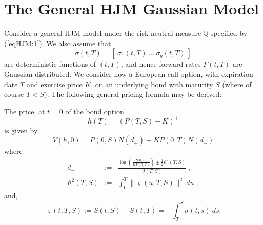 \section{The General HJM Gaussian Model}
Consider a general HJM model under the risk-neutral measure
$\mathbb{Q}$ specified by (\ref{eqHJM:1}). We also assume that 
$$
\sigma(t,T)= \left[\:\sigma_1(t,T)\:\dots\:\sigma_q(t,T)\:\right]
$$
are deterministic functions of $(t,T)$, and hence forward rates
$F(t,T)$ are Gaussian distributed. We consider now a European call
option, with expiration date $T$ and exercise price $K$, on an
underlying bond with maturity $S$ (where of course $T<S$). The
following general pricing formula may be derived:
\begin{propos} The
  price, at $t=0$ of the bond option
$$
h(T)=(P(T,S)-K)^+
$$
is given by
\begin{equation} 
\label{eqGaussianFROptionsFormula:1}
V(h,0)=P(0,S)N(d_+)-K P(0,T)N(d_-)
\end{equation}
where
\begin{equation}
\label{d+-}
\begin{array}{rcl}
d_{\pm} & := & \displaystyle \frac{\log\left(\frac{P(0,S)}{K
      P(0,T)}\right)\pm\frac{1}{2}\vartheta^2(T,S)}{\vartheta(T,S)}\; , \\ 
\vartheta^2(T,S) & := &\displaystyle \int_0^T \| \varsigma(u;T,S)
\|^2\:du\; ;
\end{array}
\end{equation}
and,
\begin{equation}
\label{GaussianForwardVol2}
\varsigma(t;T,S) := S(t,S)-S(t,T)=-\int_T^S \sigma(t,s)\: ds.
\end{equation}
\end{propos}
